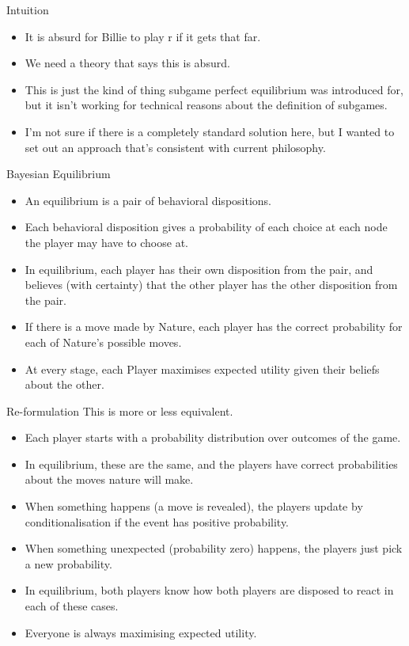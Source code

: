 \documentclass[
  ignorenonframetext,
]{beamer}
\providecommand{\tightlist}{%
  \setlength{\itemsep}{0pt}\setlength{\parskip}{0pt}}
\begin{document}
\begin{frame}{Intuition}
\protect\hypertarget{intuition}{}
\begin{itemize}
\tightlist
\item
  It is absurd for Billie to play r if it gets that far.
\item
  We need a theory that says this is absurd.
\item
  This is just the kind of thing subgame perfect equilibrium was
  introduced for, but it isn't working for technical reasons about the
  definition of subgames.
\item
  I'm not sure if there is a completely standard solution here, but I
  wanted to set out an approach that's consistent with current
  philosophy.
\end{itemize}
\end{frame}

\begin{frame}{Bayesian Equilibrium}
\protect\hypertarget{bayesian-equilibrium}{}
\begin{itemize}
\tightlist
\item
  An equilibrium is a pair of behavioral dispositions.
\item
  Each behavioral disposition gives a probability of each choice at each
  node the player may have to choose at.
\item
  In equilibrium, each player has their own disposition from the pair,
  and believes (with certainty) that the other player has the other
  disposition from the pair.
\item
  If there is a move made by Nature, each player has the correct
  probability for each of Nature's possible moves.
\item
  At every stage, each Player maximises expected utility given their
  beliefs about the other.
\end{itemize}
\end{frame}

\begin{frame}{Re-formulation}
\protect\hypertarget{re-formulation}{}
This is more or less equivalent.

\begin{itemize}
\tightlist
\item
  Each player starts with a probability distribution over outcomes of
  the game.
\item
  In equilibrium, these are the same, and the players have correct
  probabilities about the moves nature will make.
\item
  When something happens (a move is revealed), the players update by
  conditionalisation if the event has positive probability.
\item
  When something unexpected (probability zero) happens, the players just
  pick a new probability.
\item
  In equilibrium, both players know how both players are disposed to
  react in each of these cases.
\item
  Everyone is always maximising expected utility.
\end{itemize}
\end{frame}
\end{document}
